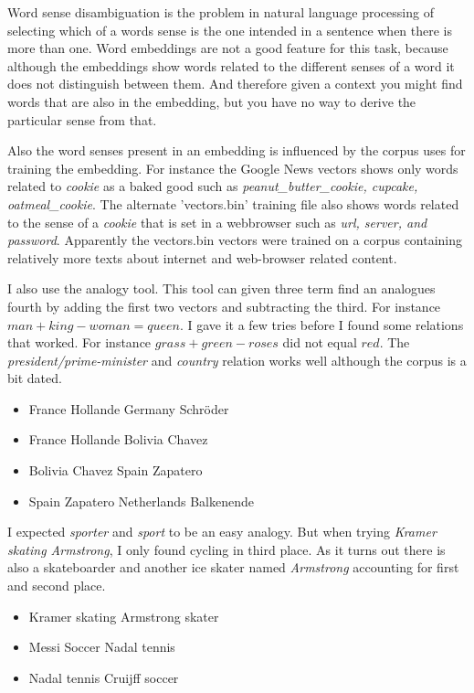 \documentclass[11pt]{article}
\begin{document}
Word sense disambiguation is the problem in natural language processing of selecting which of a words sense is the one intended in a sentence when there is more than one. Word embeddings are not a good feature for this task, because although the embeddings show words related to the different senses of a word it does not distinguish between them. And therefore given a context you might find words that are also in the embedding, but you have no way to derive the particular sense from that.

Also the word senses present in an embedding is influenced by the corpus uses for training the embedding. For instance the Google News vectors shows only words related to \emph{cookie} as a baked good such as \emph{peanut\_butter\_cookie, cupcake, oatmeal\_cookie}. The alternate 'vectors.bin' training file also shows words related to the sense of a \emph{cookie} that is set in a webbrowser such as \emph{url, server, and password}. Apparently the vectors.bin vectors were trained on a corpus containing relatively more texts about internet and web-browser related content.

I also use the analogy tool. This tool can given three term find an analogues fourth by adding the first two vectors and subtracting the third. For instance $man + king - woman = queen$. I gave it a few tries before I found some relations that worked. For instance $grass + green - roses$ did not equal $red$.
The \emph{president/prime-minister} and \emph{country} relation works well although the corpus is a bit dated.
\begin{itemize}
\item[] France Hollande Germany Schr\"{o}der
\item[] France Hollande Bolivia Chavez
\item[] Bolivia Chavez Spain Zapatero
\item[] Spain Zapatero Netherlands Balkenende
\end{itemize}

I expected \emph{sporter} and \emph{sport} to be an easy analogy. But when trying \emph{Kramer skating Armstrong}, I only found cycling in third place. As it turns out there is also a skateboarder and another ice skater named \emph{Armstrong} accounting for first and second place.

\begin{itemize}
\item[] Kramer skating Armstrong skater
\item[] Messi Soccer Nadal tennis
\item[] Nadal tennis Cruijff soccer
\end{itemize}
\end{document}
